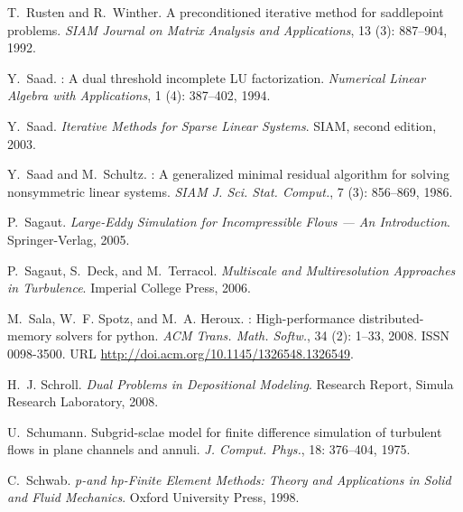 \begin{thebibliography}{467}
T.~Rusten and R.~Winther.
\newblock A preconditioned iterative method for saddlepoint problems.
\newblock \emph{SIAM Journal on Matrix Analysis and Applications}, 13
  (3): 887--904, 1992.

Y.~Saad.
: {A} dual threshold incomplete {LU} factorization.
\newblock \emph{Numerical Linear Algebra with Applications}, 1
  (4): 387--402, 1994.

Y.~Saad.
\newblock \emph{Iterative Methods for Sparse Linear Systems}.
\newblock SIAM, second edition, 2003.

Y.~Saad and M.~Schultz.
: A generalized minimal residual algorithm for solving
  nonsymmetric linear systems.
\newblock \emph{SIAM J. Sci. Stat. Comput.}, 7 (3): 856--869,
  1986.

P.~Sagaut.
\newblock \emph{Large-Eddy Simulation for Incompressible Flows --- An
  Introduction}.
\newblock Springer-Verlag, 2005.

P.~Sagaut, S.~Deck, and M.~Terracol.
\newblock \emph{Multiscale and Multiresolution Approaches in Turbulence}.
\newblock Imperial College Press, 2006.

M.~Sala, W.~F. Spotz, and M.~A. Heroux.
: {H}igh-performance distributed-memory solvers for
  python.
\newblock \emph{ACM Trans. Math. Softw.}, 34 (2): 1--33,
  2008.
\newblock ISSN 0098-3500.
\newblock URL \url{http://doi.acm.org/10.1145/1326548.1326549}.

H.~J. Schroll.
\newblock \emph{Dual Problems in Depositional Modeling}.
\newblock Research Report, Simula Research Laboratory, 2008.

U.~Schumann.
\newblock Subgrid-sclae model for finite difference simulation of turbulent
  flows in plane channels and annuli.
\newblock \emph{J. Comput. Phys.}, 18: 376--404, 1975.

C.~Schwab.
\newblock \emph{{p}-and {hp}-Finite Element Methods: Theory and Applications in
  Solid and Fluid Mechanics}.
\newblock Oxford University Press, 1998.


\end{thebibliography}
